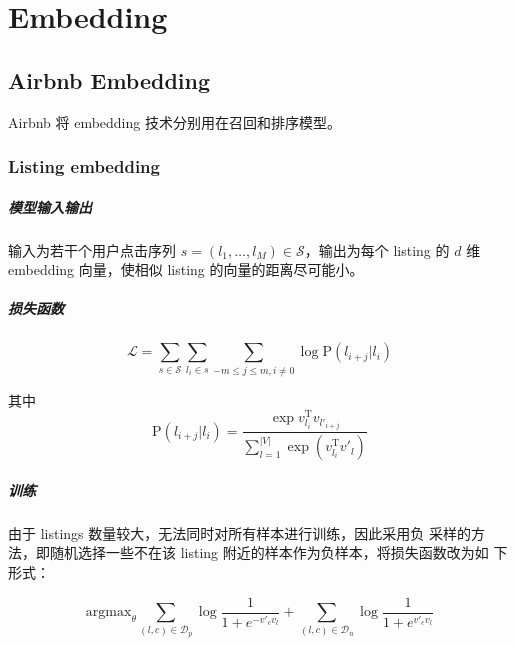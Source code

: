 \chapter{Embedding}
\section{Airbnb Embedding}
Airbnb 将 embedding 技术分别用在召回和排序模型。

\subsection{Listing embedding}
\paragraph{模型输入输出} 输入为若干个用户点击序列 $s=(l_1,\ldots,l_M) \in \mathcal{S}$，输出为每个
listing 的 $d$ 维 embedding 向量，使相似 listing 的向量的距离尽可能小。

\paragraph{损失函数}
\begin{equation}
  \mathcal{L} = \sum_{s \in \mathcal{S}} \sum_{l_i \in s} \sum_{-m \leq j \leq m, i \neq 0} \log \mathrm{P}(l_{i+j}|l_i)
\end{equation}

其中
\begin{equation}
  \mathrm{P}(l_{i+j}|l_i) = \frac{\exp v_{l_i}^{\mathrm{T}} v_{l'_{i+j}}}{\sum_{l=1}^{|V|}\exp(v_{l_i}^{\mathrm{T}} v'_l)}
\end{equation}

\paragraph{训练} 由于 listings 数量较大，无法同时对所有样本进行训练，因此采用负
采样的方法，即随机选择一些不在该 listing 附近的样本作为负样本，将损失函数改为如
下形式：

\begin{equation}
  \mathrm{argmax}_{\theta} \sum_{(l, c) \in \mathcal{D}_{p}} \log \frac{1}{1 + e^{-v'_c v_l}} + \sum_{(l, c) \in \mathcal{D}_{n}} \log \frac{1}{1 + e^{v'_c v_l}}
\end{equation}

